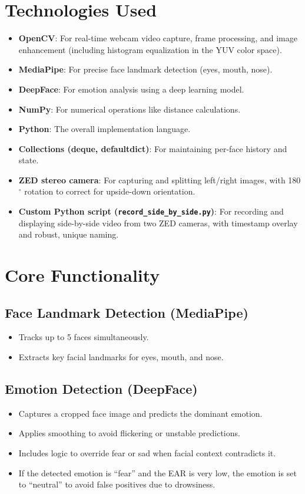 \documentclass[12pt]{article}
\begin{document}
\section{Technologies Used}
\begin{itemize}
    \item \textbf{OpenCV}: For real-time webcam video capture, frame processing, and image enhancement (including histogram equalization in the YUV color space).
    \item \textbf{MediaPipe}: For precise face landmark detection (eyes, mouth, nose).
    \item \textbf{DeepFace}: For emotion analysis using a deep learning model.
    \item \textbf{NumPy}: For numerical operations like distance calculations.
    \item \textbf{Python}: The overall implementation language.
    \item \textbf{Collections (deque, defaultdict)}: For maintaining per-face history and state.
    \item \textbf{ZED stereo camera}: For capturing and splitting left/right images, with 180$^\circ$ rotation to correct for upside-down orientation.
    \item \textbf{Custom Python script (\texttt{record\_side\_by\_side.py})}: For recording and displaying side-by-side video from two ZED cameras, with timestamp overlay and robust, unique naming.
\end{itemize}

\section{Core Functionality}
\subsection{Face Landmark Detection (MediaPipe)}
\begin{itemize}
    \item Tracks up to 5 faces simultaneously.
    \item Extracts key facial landmarks for eyes, mouth, and nose.
\end{itemize}
\subsection{Emotion Detection (DeepFace)}
\begin{itemize}
    \item Captures a cropped face image and predicts the dominant emotion.
    \item Applies smoothing to avoid flickering or unstable predictions.
    \item Includes logic to override fear or sad when facial context contradicts it.
    \item If the detected emotion is ``fear'' and the EAR is very low, the emotion is set to ``neutral'' to avoid false positives due to drowsiness.
\end{itemize}
\end{document}
